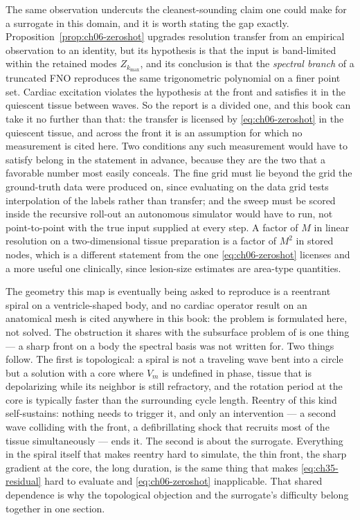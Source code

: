 The same observation
undercuts the cleanest-sounding claim one could make for a surrogate in this
domain, and it is worth stating the gap exactly. Proposition~\ref{prop:ch06-zeroshot} upgrades
resolution transfer from an empirical observation to an identity, but its
hypothesis is that the input is band-limited within the retained modes $Z_{k_{\max}}$,
and its conclusion is that the \emph{spectral branch} of a truncated FNO
reproduces the same trigonometric polynomial on a finer point set. Cardiac
excitation violates the hypothesis at the front and satisfies it in the
quiescent tissue between waves. So the report is a divided one, and this
book can take it no further than that: the transfer is licensed by
\eqref{eq:ch06-zeroshot} in the quiescent tissue, and across the front it is an
assumption for which no measurement is cited here. Two conditions any such
measurement would have to satisfy belong in the statement in advance, because
they are the two that a favorable number most easily conceals. The fine grid must
lie beyond the grid the ground-truth data were produced on, since evaluating on
the data grid tests interpolation of the labels rather than transfer; and the
sweep must be scored inside the recursive roll-out an autonomous simulator would
have to run, not point-to-point with the true input supplied at every step. A
factor of $M$ in linear resolution on a two-dimensional tissue
preparation is a factor of $M^2$ in stored nodes, which is a different
statement from the one \eqref{eq:ch06-zeroshot} licenses and a more useful one
clinically, since lesion-size estimates are area-type quantities.

The geometry this map is eventually being asked to reproduce is a reentrant spiral on a
ventricle-shaped body, and no cardiac operator result on an anatomical mesh is cited anywhere
in this book: the problem is formulated here, not solved. The obstruction it shares with the
subsurface problem of  is one
thing --- a sharp front on a body the spectral basis was not written for. Two things follow.
The first is topological: a spiral is
not a traveling wave bent into a circle but a solution with a core where $V_m$ is
undefined in phase, tissue that is depolarizing while its neighbor is still
refractory, and the rotation period at the core is typically faster than the
surrounding cycle length. Reentry of this kind self-sustains: nothing needs to
trigger it, and only an intervention --- a second wave colliding with the front, a
defibrillating shock that recruits most of the tissue simultaneously --- ends it.
The second is about the surrogate. Everything in the spiral itself that makes reentry
hard to simulate, the thin front, the sharp gradient at the core, the long
duration, is the same thing that makes \eqref{eq:ch35-residual} hard to evaluate
and \eqref{eq:ch06-zeroshot} inapplicable. That shared dependence is why the
topological objection and the surrogate's difficulty belong
together in one section.

